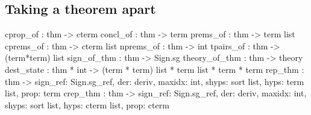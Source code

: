 \subsection{Taking a theorem apart}
\begin{ttbox} 
cprop_of      : thm -> cterm
concl_of      : thm -> term
prems_of      : thm -> term list
cprems_of     : thm -> cterm list
nprems_of     : thm -> int
tpairs_of     : thm -> (term*term) list
sign_of_thm   : thm -> Sign.sg
theory_of_thm : thm -> theory
dest_state    : thm * int -> (term * term) list * term list * term * term
rep_thm       : thm -> {\ttlbrace}sign_ref: Sign.sg_ref, der: deriv, maxidx: int,
                        shyps: sort list, hyps: term list, prop: term\ttrbrace
crep_thm      : thm -> {\ttlbrace}sign_ref: Sign.sg_ref, der: deriv, maxidx: int,
                        shyps: sort list, hyps: cterm list, prop: cterm\ttrbrace
\end{ttbox}
